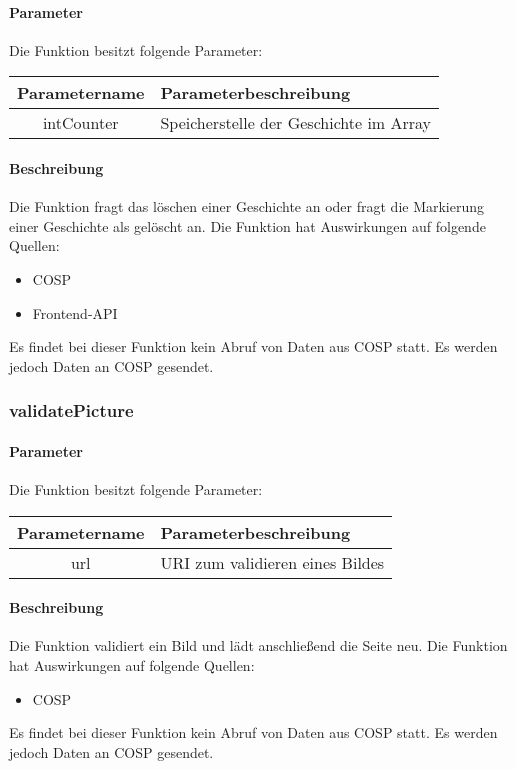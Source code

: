 \paragraph{Parameter} Die Funktion besitzt folgende Parameter:
\begin{table}[H]
	\begin{tabular}{|c|p{11cm}|}
		\hline
		\textbf{Parametername} & \textbf{Parameterbeschreibung} \\ \hline
		intCounter & Speicherstelle der Geschichte im Array \\ \hline
	\end{tabular}
\end{table}
\paragraph{Beschreibung} Die Funktion fragt das löschen einer Geschichte an oder fragt die Markierung einer Geschichte als gelöscht an. Die Funktion hat Auswirkungen auf folgende Quellen:
\begin{itemize}
	\item COSP
	\item Frontend-API
\end{itemize}
Es findet bei dieser Funktion kein Abruf von Daten aus {\glqq COSP\grqq} statt. Es werden jedoch Daten an {\glqq COSP\grqq} gesendet.
\subsubsection{validatePicture}
\paragraph{Parameter} Die Funktion besitzt folgende Parameter:
\begin{table}[H]
	\begin{tabular}{|c|p{11cm}|}
		\hline
		\textbf{Parametername} & \textbf{Parameterbeschreibung} \\ \hline
		url & URI zum validieren eines Bildes \\ \hline
	\end{tabular}
\end{table}
\paragraph{Beschreibung} Die Funktion validiert ein Bild und lädt anschließend die Seite neu. Die Funktion hat Auswirkungen auf folgende Quellen:
\begin{itemize}
	\item COSP
\end{itemize}
Es findet bei dieser Funktion kein Abruf von Daten aus {\glqq COSP\grqq} statt. Es werden jedoch Daten an {\glqq COSP\grqq} gesendet.
